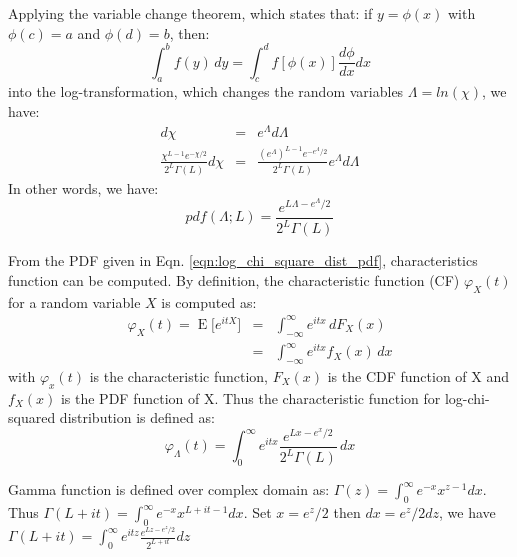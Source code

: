 \documentclass[journal]{IEEEtran}
\begin{document}
Applying the variable change theorem, which states that: if $y=\phi(x)$ with $\phi(c)=a$ and $\phi(d)=b$, then:
\begin{equation}
 \int_a^b \! f(y) \, dy = \int_c^d \! f[\phi(x)] \frac{d\phi}{dx} dx
\end{equation}
into the log-transformation, which changes the random variables $\Lambda=ln(\chi)$, we have:
\begin{eqnarray*}
  d\chi &=& e^\Lambda d\Lambda \\
  \frac{\chi^{L-1}e^{-\chi/2}}{2^L\Gamma(L)} d\chi &=&  \frac{(e^\Lambda)^{L-1}e^{-e^\Lambda/2}}{2^L\Gamma(L)} e^\Lambda d\Lambda
\end{eqnarray*}
In other words, we have:
\begin{equation}
pdf(\Lambda;L) = \frac{e^{L \Lambda -e^\Lambda/2}}{2^L\Gamma(L)}
\label{eqn:log_chi_square_dist_pdf}
\end{equation}

From the PDF given in Eqn. \ref{eqn:log_chi_square_dist_pdf}, characteristics function can be computed.
By definition, the characteristic function (CF) $\varphi_X(t)$ for a random variable $X$ is computed as:
\begin{eqnarray*}
\varphi_X(t) = \operatorname{E}\big[e^{itX}\big] 
      &=& \int_{-\infty}^\infty e^{itx}\,dF_X(x) \\ 
      &=& \int_{-\infty}^\infty e^{itx} f_X(x)\,dx 
\end{eqnarray*}
with $\varphi_x(t)$ is the characteristic function,
     $F_X(x)$ is the CDF function of X and
     $f_X(x)$ is the PDF function of X.
Thus the characteristic function for log-chi-squared distribution is defined as: 
\begin{equation}
\varphi_\Lambda(t)=\int_0^\infty e^{itx} \frac{e^{Lx-e^x/2}}{2^L \Gamma(L)}\,dx 
\end{equation}

Gamma function is defined over complex domain as:
$\Gamma(z) = \int_0^\infty  e^{-x} x^{z-1} dx .$
Thus $\Gamma(L+it) = \int_0^\infty  e^{-x} x^{L+it-1} dx .$
Set $x=e^z/2$ then $dx=e^z/2dz$, we have $\Gamma(L+it)= \int_0^\infty  e^{itz} \frac{e^{Lz-e^z/2}}{2^{L+it}} dz$
\end{document}
